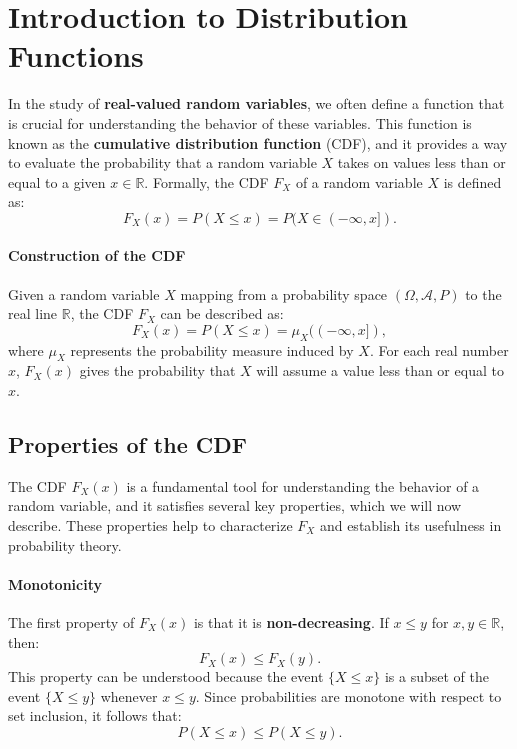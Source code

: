     \section{Introduction to Distribution Functions}
    
    In the study of \textbf{real-valued random variables}, we often define a function that is crucial for understanding the behavior of these variables. This function is known as the \textbf{cumulative distribution function} (CDF), and it provides a way to evaluate the probability that a random variable \( X \) takes on values less than or equal to a given \( x \in \mathbb{R} \). Formally, the CDF \( F_X \) of a random variable \( X \) is defined as:
    \[
    F_X(x) = P(X \leq x) = P(X \in (-\infty, x]).
    \]
    
    \paragraph{Construction of the CDF}
    
    Given a random variable \( X \) mapping from a probability space \( (\Omega, \mathcal{A}, P) \) to the real line \( \mathbb{R} \), the CDF \( F_X \) can be described as:
    \[
    F_X(x) = P(X \leq x) = \mu_X((- \infty, x]),
    \]
    where \( \mu_X \) represents the probability measure induced by \( X \). For each real number \( x \), \( F_X(x) \) gives the probability that \( X \) will assume a value less than or equal to \( x \).
    
    \subsection{Properties of the CDF}
    
    The CDF \( F_X(x) \) is a fundamental tool for understanding the behavior of a random variable, and it satisfies several key properties, which we will now describe. These properties help to characterize \( F_X \) and establish its usefulness in probability theory.
    
    \paragraph{Monotonicity}
    
    The first property of \( F_X(x) \) is that it is \textbf{non-decreasing}. If \( x \leq y \) for \( x, y \in \mathbb{R} \), then:
    \[
    F_X(x) \leq F_X(y).
    \]
    This property can be understood because the event \( \{X \leq x\} \) is a subset of the event \( \{X \leq y\} \) whenever \( x \leq y \). Since probabilities are monotone with respect to set inclusion, it follows that:
    \[
    P(X \leq x) \leq P(X \leq y).
    \]
    
